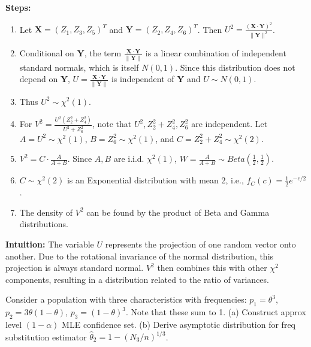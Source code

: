 \begin{solution}
\textbf{Steps:}
\begin{enumerate}
    \item Let $\mathbf{X} = (Z_1, Z_3, Z_5)^T$ and $\mathbf{Y} = (Z_2, Z_4, Z_6)^T$. Then $U^2 = \frac{(\mathbf{X} \cdot \mathbf{Y})^2}{\|\mathbf{Y}\|^2}$.
    \item Conditional on $\mathbf{Y}$, the term $\frac{\mathbf{X} \cdot \mathbf{Y}}{\|\mathbf{Y}\|}$ is a linear combination of independent standard normals, which is itself $N(0, 1)$. Since this distribution does not depend on $\mathbf{Y}$, $U = \frac{\mathbf{X} \cdot \mathbf{Y}}{\|\mathbf{Y}\|}$ is independent of $\mathbf{Y}$ and $U \sim N(0, 1)$.
    \item Thus $U^2 \sim \chi^2(1)$.
    \item For $V^2 = \frac{U^2 (Z_2^2 + Z_4^2)}{U^2 + Z_6^2}$, note that $U^2, Z_2^2+Z_4^2, Z_6^2$ are independent. Let $A = U^2 \sim \chi^2(1)$, $B = Z_6^2 \sim \chi^2(1)$, and $C = Z_2^2 + Z_4^2 \sim \chi^2(2)$.
    \item $V^2 = C \cdot \frac{A}{A+B}$. Since $A, B$ are i.i.d. $\chi^2(1)$, $W = \frac{A}{A+B} \sim Beta(\frac{1}{2}, \frac{1}{2})$.
    \item $C \sim \chi^2(2)$ is an Exponential distribution with mean 2, i.e., $f_C(c) = \frac{1}{2} e^{-c/2}$.
    \item The density of $V^2$ can be found by the product of Beta and Gamma distributions.
\end{enumerate}

\textbf{Intuition:}
The variable $U$ represents the projection of one random vector onto another. Due to the rotational invariance of the normal distribution, this projection is always standard normal. $V^2$ then combines this with other $\chi^2$ components, resulting in a distribution related to the ratio of variances.
\end{solution}

\begin{exercise}
\label{applied:2010:4}
Consider a population with three characteristics with frequencies: $p_1 = \theta^3$, $p_2 = 3\theta(1-\theta)$, $p_3 = (1-\theta)^3$. Note that these sum to 1.
(a) Construct approx level $(1-\alpha)$ MLE confidence set.
(b) Derive asymptotic distribution for freq substitution estimator $\hat{\theta}_2 = 1 - (N_3/n)^{1/3}$.
\end{exercise}

